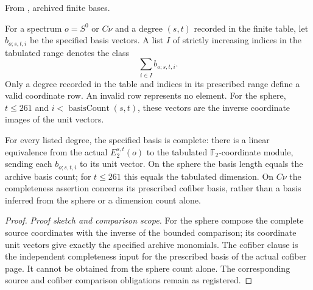 \begin{theorem}
\label{sem:Computation:table-bases}
From \cite{LinProgram}, archived finite bases.\par
For a spectrum $o=S^0$ or $C\nu$ and a degree $(s,t)$ recorded in the
finite table, let $b_{o;s,t,i}$ be the specified basis vectors. A list $I$
of strictly increasing indices in the tabulated range denotes the class
\[
\sum_{i\in I}b_{o;s,t,i}.
\]
Only a degree recorded in the table and indices in its prescribed range
define a valid coordinate row. An invalid row represents no element.
For the sphere, $t\leq261$ and $i<\operatorname{basisCount}(s,t)$, these
vectors are the inverse coordinate images of the unit vectors.

For every listed degree, the specified basis is complete: there is a
linear equivalence from the actual $E_2^{s,t}(o)$ to the tabulated
$\mathbb F_2$-coordinate module, sending each $b_{o;s,t,i}$ to its unit
vector. On the sphere the basis length equals the archive basis count;
for $t\leq261$ this equals the tabulated dimension. On $C\nu$ the
completeness assertion concerns its prescribed cofiber basis, rather than
a basis inferred from the sphere or a dimension count alone.
\end{theorem}
\begin{proof}
\textit{Proof sketch and comparison scope.}
For the sphere compose the complete source coordinates with the inverse
of the bounded comparison; its coordinate unit vectors give exactly the
specified archive monomials. The cofiber clause is the independent
completeness input for the prescribed basis of the actual cofiber page.
It cannot be obtained from the sphere count alone. The corresponding
source and cofiber comparison obligations remain as registered.
\end{proof}



